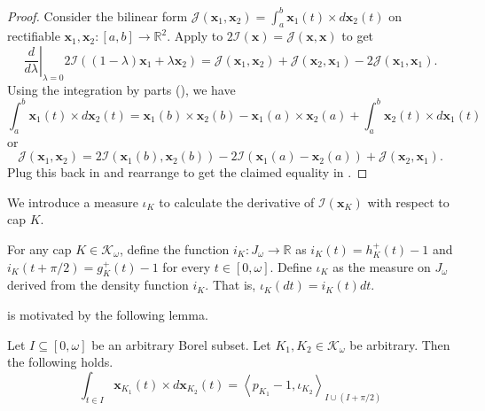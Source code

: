 \begin{proof}
Consider the bilinear form \(\mathcal{J}(\mathbf{x}_1, \mathbf{x}_2) = \int_a ^b \mathbf{x}_1(t) \times d \mathbf{x}_2(t)\) on rectifiable \(\mathbf{x}_1, \mathbf{x}_2 : [a, b] \to \mathbb{R}^2\). Apply  to \(2\mathcal{I}(\mathbf{x}) = \mathcal{J}(\mathbf{x}, \mathbf{x})\) to get
\begin{equation}
\label{eqn:variation-curve}
\left. \frac{d}{d \lambda} \right|_{\lambda = 0} 2\mathcal{I}((1 - \lambda)\mathbf{x}_1 + \lambda \mathbf{x}_2) = \mathcal{J}(\mathbf{x}_1, \mathbf{x}_2) + \mathcal{J}(\mathbf{x}_2, \mathbf{x}_1) - 2 \mathcal{J}(\mathbf{x}_1, \mathbf{x}_1).
\end{equation}
Using the integration by parts (), we have
\[
\int_a^b \mathbf{x}_1(t) \times d \mathbf{x}_2(t) = \mathbf{x}_1 (b) \times \mathbf{x}_2(b) - \mathbf{x}_1(a) \times \mathbf{x}_2(a) + \int_a^b \mathbf{x}_2(t) \times d\mathbf{x}_1 (t)
\]
or
\[
\mathcal{J}(\mathbf{x}_1, \mathbf{x}_2) = 2\mathcal{I}(\mathbf{x}_1(b), \mathbf{x}_2(b)) - 2\mathcal{I}(\mathbf{x}_1(a) - \mathbf{x}_2(a)) + \mathcal{J}(\mathbf{x}_2, \mathbf{x}_1).
\]
Plug this back in  and rearrange to get the claimed equality in .
\end{proof}

We introduce a measure \(\iota_K\) to calculate the derivative of \(\mathcal{I}(\mathbf{x}_K)\) with respect to cap \(K\).

\begin{definition}

For any cap \(K \in \mathcal{K}_{\omega}\), define the function \(i_K : J_\omega \to \mathbb{R}\) as \(i_K(t) = h_K^+(t) - 1\) and \(i_K(t + \pi / 2) = g^+_K(t) - 1\) for every \(t \in [0, \omega]\). Define \(\iota_K\) as the measure on \(J_\omega\) derived from the density function \(i_K\). That is, \(\iota_K(dt) = i_K(t) dt\).

\label{def:i-cap}
\end{definition}

 is motivated by the following lemma.

\begin{lemma}

Let \(I \subseteq [0, \omega]\) be an arbitrary Borel subset. Let \(K_1, K_2 \in \mathcal{K}_{\omega}\) be arbitrary. Then the following holds.
\[
\int_{t \in I} \mathbf{x}_{K_1}(t) \times d \mathbf{x}_{K_2} (t) = \left< p_{K_1} - 1, \iota_{K_2} \right>_{I \cup (I + \pi/2)} 
\]

\label{lem:i-cap}
\end{lemma}

